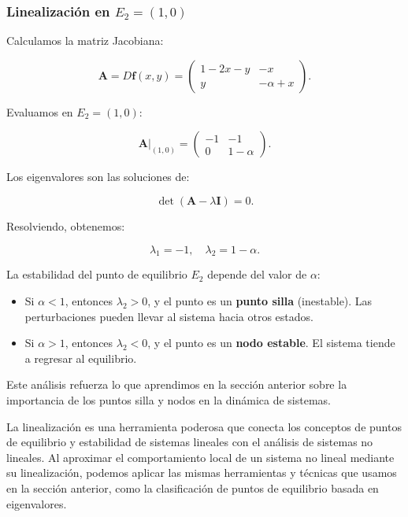 \subsubsection{Linealización en $E_2 = (1, 0)$}

Calculamos la matriz Jacobiana:

\begin{equation}
    \mathbf{A} = D\mathbf{f}(x, y) =
    \begin{pmatrix}
        1 - 2x - y & -x \\
        y & -\alpha + x
    \end{pmatrix}.
\end{equation}

Evaluamos en $E_2 = (1, 0)$:

\begin{equation}
    \mathbf{A}|_{(1,0)} =
    \begin{pmatrix}
        -1 & -1 \\
        0 & 1 - \alpha
    \end{pmatrix}.
\end{equation}

Los eigenvalores son las soluciones de:

\begin{equation}
    \det(\mathbf{A} - \lambda \mathbf{I}) = 0.
\end{equation}

Resolviendo, obtenemos:

\begin{equation}
    \lambda_1 = -1, \quad \lambda_2 = 1 - \alpha.
\end{equation}

La estabilidad del punto de equilibrio $E_2$ depende del valor de $\alpha$:
\begin{itemize} 
    \item Si $\alpha < 1$, entonces $\lambda_2 > 0$, y el punto es un \textbf{punto silla} (inestable). Las perturbaciones pueden llevar al sistema hacia otros estados.
    \item Si $\alpha > 1$, entonces $\lambda_2 < 0$, y el punto es un \textbf{nodo estable}. El sistema tiende a regresar al equilibrio.
\end{itemize}

Este análisis refuerza lo que aprendimos en la sección anterior sobre la importancia de los puntos silla y nodos en la dinámica de sistemas.

La linealización es una herramienta poderosa que conecta los conceptos de puntos de equilibrio y estabilidad de sistemas lineales con el análisis de sistemas no lineales. Al aproximar el comportamiento local de un sistema no lineal mediante su linealización, podemos aplicar las mismas herramientas y técnicas que usamos en la sección anterior, como la clasificación de puntos de equilibrio basada en eigenvalores.


